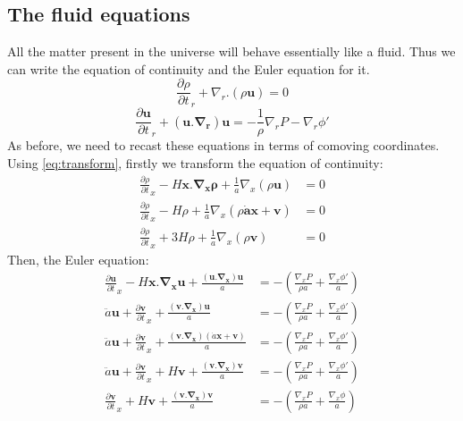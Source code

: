 \documentclass[12pt,a4paper,twoside]{book}
\def\pa{{\partial}}
\begin{document}
		\subsection{The fluid equations}
			All the matter present in the universe will behave essentially like a fluid. Thus we can write the equation of continuity and the Euler equation for it.
			\begin{equation}
				\frac{\partial \rho}{\partial t}_r+\nabla_r.(\rho\mathbf{u})=0
			\end{equation}
			\begin{equation}
				\frac{\partial\mathbf{u}}{\partial t}_r+\left(\mathbf{u.\nabla_r}\right)\mathbf{u}=-\frac{1}{\rho}\nabla_rP-\nabla_r\phi'
			\end{equation}
			As before, we need to recast these equations in terms of comoving coordinates. Using \ref{eq:transform}, firstly we transform the equation of continuity:
			\begin{equation}
				\begin{aligned}
					\frac{\partial\rho}{\partial t}_x -H\mathbf{x.\nabla_x\rho}+\frac{1}{a}\nabla_x(\rho\mathbf{u})&=0\\
					\frac{\partial\rho}{\partial t}_x -H\rho+\frac{1}{a}\nabla_x(\rho\mathbf{\dot{a}\mathbf{x}+\mathbf{v}})&=0\\
					\frac{\partial\rho}{\partial t}_x +3H\rho+\frac{1}{a}\nabla_x(\rho\mathbf{v})&=0
					\end{aligned}
					\label{eq:cont_x_nodelta}
			\end{equation}
			Then, the Euler equation:
			\begin{equation}
				\begin{aligned}
					\frac{\pa\mathbf{u}}{\partial t}_x -H\mathbf{x.\nabla_xu}+\frac{\mathbf{(u.\nabla_x)u}}{a}&=-\left(\frac{\nabla_xP}{\rho a}+\frac{\nabla_x\phi'}{a}\right)\\
					\ddot{a}\mathbf{u}+\frac{\pa \mathbf{v}}{\partial t}_x +\frac{\mathbf{(v.\nabla_x)u}}{a}&=-\left(\frac{\nabla_xP}{\rho a}+\frac{\nabla_x\phi'}{a}\right)\\
					\ddot{a}\mathbf{u}+\frac{\pa \mathbf{v}}{\partial t}_x +\frac{\mathbf{(v.\nabla_x)}(\dot{a}\mathbf{x+v})}{a}&=-\left(\frac{\nabla_xP}{\rho a}+\frac{\nabla_x\phi'}{a}\right)\\
					\ddot{a}\mathbf{u}+\frac{\pa \mathbf{v}}{\partial t}_x +H\mathbf{v}+\frac{\mathbf{(v.\nabla_x)}\mathbf{v}}{a}&=-\left(\frac{\nabla_xP}{\rho a}+\frac{\nabla_x\phi'}{a}\right)\\
					\frac{\pa \mathbf{v}}{\partial t}_x +H\mathbf{v}+\frac{\mathbf{(v.\nabla_x)}\mathbf{v}}{a}&=-\left(\frac{\nabla_xP}{\rho a}+\frac{\nabla_x\phi}{a}\right)\\
				\end{aligned}
				\label{eq:euler_x_nodelta}
			\end{equation}
\end{document}
